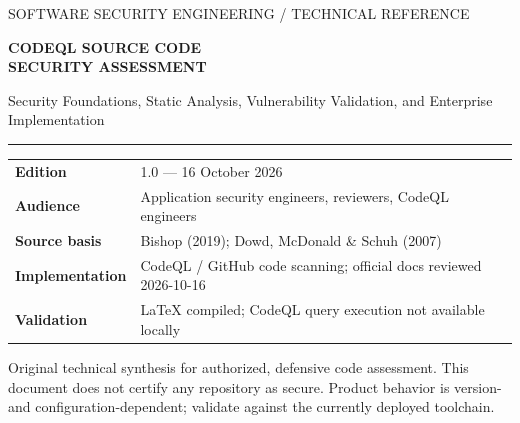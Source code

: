 \documentclass[11pt,letterpaper,oneside]{book}
\begin{document}
\frontmatter
\hypersetup{pageanchor=false}%
\begin{titlepage}
\thispagestyle{empty}
\vspace*{0.7in}
{\sffamily\Large\color{azure} SOFTWARE SECURITY ENGINEERING / TECHNICAL REFERENCE}\par\vspace{0.55in}
{\sffamily\fontsize{32}{38}\selectfont\bfseries\color{navy} CODEQL SOURCE CODE\\SECURITY ASSESSMENT}\par
\vspace{0.32in}
{\sffamily\Large Security Foundations, Static Analysis, Vulnerability Validation, and Enterprise Implementation}\par
\vspace{0.85in}\noindent\color{azure}\rule{\linewidth}{1.5pt}\par\vspace{0.4in}
\begin{tabular}{ll}
\textbf{Edition} & 1.0 --- 16 October 2026 \\
\textbf{Audience} & Application security engineers, reviewers, CodeQL engineers \\
\textbf{Source basis} & Bishop (2019); Dowd, McDonald \& Schuh (2007) \\
\textbf{Implementation} & CodeQL / GitHub code scanning; official docs reviewed 2026-10-16 \\
\textbf{Validation} & LaTeX compiled; CodeQL query execution not available locally
\end{tabular}
\vfill
{\small\color{muted}Original technical synthesis for authorized, defensive code assessment. This document does not certify any repository as secure. Product behavior is version- and configuration-dependent; validate against the currently deployed toolchain.}\par
\end{titlepage}\hypersetup{pageanchor=true}
\end{document}
